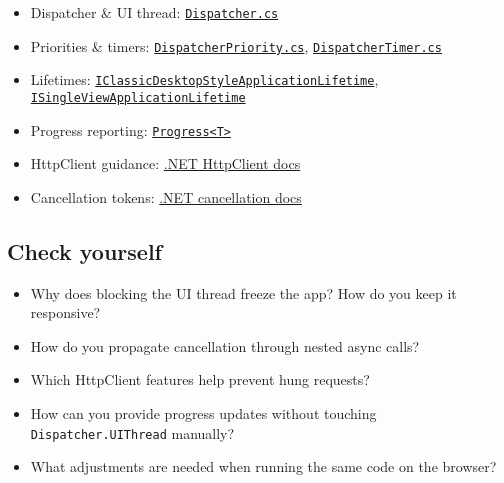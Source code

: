\begin{itemize}
\tightlist
\item
  Dispatcher \& UI thread:
  \href{https://github.com/AvaloniaUI/Avalonia/blob/master/src/Avalonia.Base/Threading/Dispatcher.cs}{\passthrough{\lstinline!Dispatcher.cs!}}
\item
  Priorities \& timers:
  \href{https://github.com/AvaloniaUI/Avalonia/blob/master/src/Avalonia.Base/Threading/DispatcherPriority.cs}{\passthrough{\lstinline!DispatcherPriority.cs!}},
  \href{https://github.com/AvaloniaUI/Avalonia/blob/master/src/Avalonia.Base/Threading/DispatcherTimer.cs}{\passthrough{\lstinline!DispatcherTimer.cs!}}
\item
  Lifetimes:
  \href{https://github.com/AvaloniaUI/Avalonia/blob/master/src/Avalonia.Controls/ApplicationLifetimes/ClassicDesktopStyleApplicationLifetime.cs}{\passthrough{\lstinline!IClassicDesktopStyleApplicationLifetime!}},
  \href{https://github.com/AvaloniaUI/Avalonia/blob/master/src/Avalonia.Controls/ApplicationLifetimes/ISingleViewApplicationLifetime.cs}{\passthrough{\lstinline!ISingleViewApplicationLifetime!}}
\item
  Progress reporting:
  \href{https://learn.microsoft.com/dotnet/api/system.progress-1}{\passthrough{\lstinline!Progress<T>!}}
\item
  HttpClient guidance:
  \href{https://learn.microsoft.com/dotnet/fundamentals/networking/http/httpclient}{.NET
  HttpClient docs}
\item
  Cancellation tokens:
  \href{https://learn.microsoft.com/dotnet/standard/threading/cancellation-in-managed-threads}{.NET
  cancellation docs}
\end{itemize}

\subsection{Check yourself}\label{check-yourself-15}

\begin{itemize}
\tightlist
\item
  Why does blocking the UI thread freeze the app? How do you keep it
  responsive?
\item
  How do you propagate cancellation through nested async calls?
\item
  Which HttpClient features help prevent hung requests?
\item
  How can you provide progress updates without touching
  \passthrough{\lstinline!Dispatcher.UIThread!} manually?
\item
  What adjustments are needed when running the same code on the browser?
\end{itemize}

